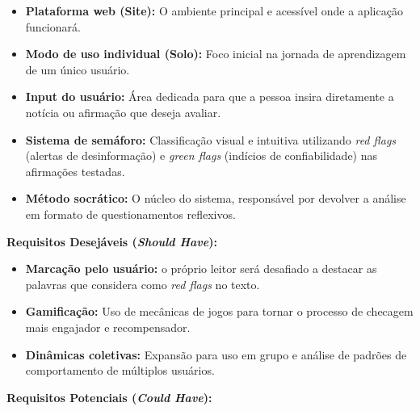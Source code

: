 \documentclass[
  brazilian,
  11pt,
]{article}
\providecommand{\tightlist}{%
  \setlength{\itemsep}{0pt}\setlength{\parskip}{0pt}}
\begin{document}
\begin{itemize}
\tightlist
\item
  \textbf{Plataforma web (Site):} O ambiente principal e acessível onde a aplicação funcionará.
\item
  \textbf{Modo de uso individual (Solo):} Foco inicial na jornada de aprendizagem de um único usuário.
\item
  \textbf{Input do usuário:} Área dedicada para que a pessoa insira diretamente a notícia ou afirmação que deseja avaliar.
\item
  \textbf{Sistema de semáforo:} Classificação visual e intuitiva utilizando \emph{red flags} (alertas de desinformação) e \emph{green flags} (indícios de confiabilidade) nas afirmações testadas.
\item
  \textbf{Método socrático:} O núcleo do sistema, responsável por devolver a análise em formato de questionamentos reflexivos.
\end{itemize}

\textbf{Requisitos Desejáveis (\emph{Should Have}):}

\begin{itemize}
\tightlist
\item
  \textbf{Marcação pelo usuário:} o próprio leitor será desafiado a destacar as palavras que considera como \emph{red flags} no texto.
\item
  \textbf{Gamificação:} Uso de mecânicas de jogos para tornar o processo de checagem mais engajador e recompensador.
\item
  \textbf{Dinâmicas coletivas:} Expansão para uso em grupo e análise de padrões de comportamento de múltiplos usuários.
\end{itemize}

\textbf{Requisitos Potenciais (\emph{Could Have}):}
\end{document}
